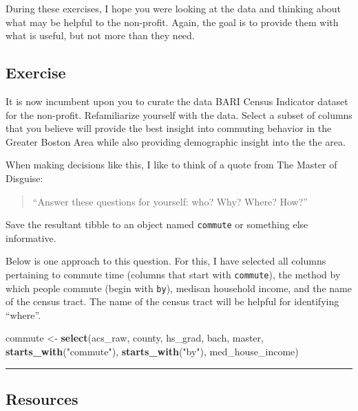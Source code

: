 \documentclass[
]{book}
\newenvironment{Shaded}{\begin{snugshade}}{\end{snugshade}}
\newcommand{\KeywordTok}[1]{\textcolor[rgb]{0.13,0.29,0.53}{\textbf{#1}}}
\newcommand{\NormalTok}[1]{#1}
\newcommand{\StringTok}[1]{\textcolor[rgb]{0.31,0.60,0.02}{#1}}
\begin{document}
During these exercises, I hope you were looking at the data and thinking about what may be helpful to the non-profit. Again, the goal is to provide them with what is useful, but not more than they need.

\hypertarget{exercise-1}{%
\subsection{Exercise}\label{exercise-1}}

It is now incumbent upon you to curate the data BARI Census Indicator dataset for the non-profit. Refamiliarize yourself with the data. Select a subset of columns that you believe will provide the best insight into commuting behavior in the Greater Boston Area while also providing demographic insight into the the area.

When making decisions like this, I like to think of a quote from The Master of Disguise:

\begin{quote}
``Answer these questions for yourself: who? Why? Where? How?''
\end{quote}

Save the resultant tibble to an object named \texttt{commute} or something else informative.

Below is one approach to this question. For this, I have selected all columns pertaining to commute time (columns that start with \texttt{commute}), the method by which people commute (begin with \texttt{by}), medisan household income, and the name of the census tract. The name of the census tract will be helpful for identifying ``where''.

\begin{Shaded}
\begin{Highlighting}[]
\NormalTok{commute \textless{}{-}}\StringTok{ }\KeywordTok{select}\NormalTok{(acs\_raw,}
\NormalTok{                  county,}
\NormalTok{                  hs\_grad, bach, master,}
                  \KeywordTok{starts\_with}\NormalTok{(}\StringTok{"commute"}\NormalTok{),}
                  \KeywordTok{starts\_with}\NormalTok{(}\StringTok{"by"}\NormalTok{),}
\NormalTok{                  med\_house\_income)}
\end{Highlighting}
\end{Shaded}

\begin{center}\rule{0.5\linewidth}{0.5pt}\end{center}

\hypertarget{resources-1}{%
\subsection{Resources}\label{resources-1}}
\end{document}
